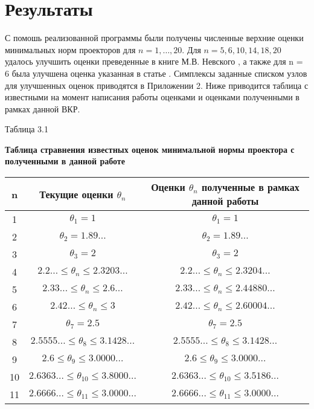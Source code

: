 \documentclass[12pt, a4paper]{extarticle}
\begin{document}
\section{Результаты} 
С помошь реализованной программы были получены численные верхние оценки минимальных норм проекторов для $n=1,\ldots,20$. Для $n = 5,6,10,14,18,20$ удалось улучшить оценки преведенные в книге М.В. Невского \cite{1}, а также для n = 6 была улучшена оценка указанная в статье \cite{10}. Симплексы заданные списком узлов для улучшенных оценок приводятся в Приложении 2. Ниже приводится таблица с известными на момент написания работы оценками и оценками полученными в рамках данной ВКР.
\begin{flushright}
	Таблица 3.1
\end{flushright}
\begin{center}
	{\bf Таблица стравнения известных оценок минимальной нормы проектора с полученными в данной работе}
	\begin{tabular}{|c|c|c|} \hline
		n& Текущие оценки $\theta_n$ & Оценки $\theta_n$ полученные в рамках данной работы  \\ \hline
		1 & $\theta_1 = 1$ & $\theta_1 = 1$ \\ \hline
		2 & $\theta_2 = 1.89\ldots$ & $\theta_2 = 1.89\ldots$\\ \hline
		3 & $\theta_3 = 2$ & $\theta_3 = 2$\\ \hline
		4 & $2.2\ldots \leqslant\theta_n\leqslant2.3203\ldots$ & $2.2\ldots \leqslant\theta_n\leqslant2.3204\ldots$\\ \hline
		5 & $2.33\ldots \leqslant\theta_n\leqslant2.6\ldots$& $2.33\ldots \leqslant\theta_n\leqslant2.44880\ldots $\\\hline
		6 & $2.42\ldots \leqslant\theta_n\leqslant3$ & $2.42\ldots \leqslant\theta_n\leqslant2.60004\ldots$ \\ \hline
		7 & $\theta_7 = 2.5$& $\theta_7 = 2.5$ \\ \hline
		8 & $2.5555\ldots\leqslant\theta_8\leqslant3.1428\dots$ &  $2.5555\ldots\leqslant\theta_8\leqslant3.1428\dots$ \\ \hline
		9 &$2.6\leqslant\theta_9\leqslant3.0000\ldots$ & $2.6\leqslant\theta_9\leqslant3.0000\ldots$\\ \hline
		10 &$2.6363\ldots\leqslant\theta_{10}\leqslant3.8000\dots$ &$2.6363\ldots\leqslant\theta_{10}\leqslant3.5186\dots$ \\ \hline
		11 &$2.6666\ldots\leqslant\theta_{11}\leqslant3.0000\dots$ &$2.6666\ldots\leqslant\theta_{11}\leqslant3.0000\dots$  \\ \hline

\end{tabular}
\end{center}
\end{document}
